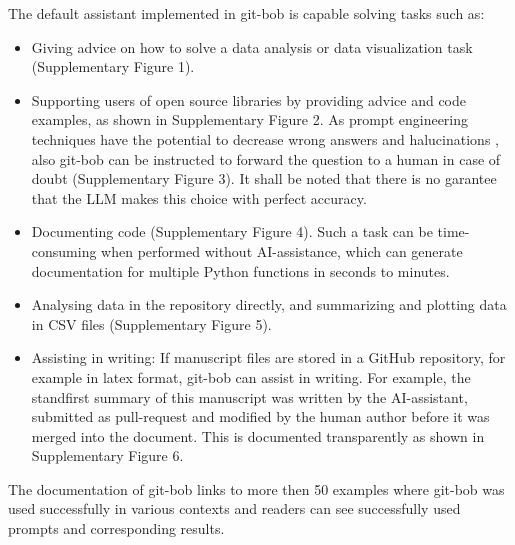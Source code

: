 \documentclass[sn-mathphys-num]{sn-jnl}%
\theoremstyle{thmstyleone}%
\theoremstyle{thmstyletwo}%
\theoremstyle{thmstylethree}%
\begin{document}
The default assistant implemented in git-bob is capable solving tasks such as: \begin{itemize}
  \item Giving advice on how to solve a data analysis or data visualization task (Supplementary Figure 1).
  \item Supporting users of open source libraries by providing advice and code examples, as shown in Supplementary Figure 2. As prompt engineering techniques have the potential to decrease wrong answers and halucinations \cite{yin2023largelanguagemodelsknow}, also git-bob can be instructed to forward the question to a human in case of doubt (Supplementary Figure 3). It shall be noted that there is no garantee that the LLM makes this choice with perfect accuracy. 
  \item Documenting code (Supplementary Figure 4). Such a task can be time-consuming when performed without AI-assistance, which can generate documentation for multiple Python functions in seconds to minutes. 
  \item Analysing data in the repository directly, and summarizing and plotting data in CSV files (Supplementary Figure 5). 
  \item Assisting in writing: If manuscript files are stored in a GitHub repository, for example in latex format, git-bob can assist in writing. For example, the standfirst summary of this manuscript was written by the AI-assistant, submitted as pull-request and modified by the human author before it was merged into the document. This is documented transparently as shown in Supplementary Figure 6.
  \end{itemize}
The documentation of git-bob links to more then 50 examples where git-bob was used successfully in various contexts and readers can see successfully used prompts and corresponding results.
\end{document}
